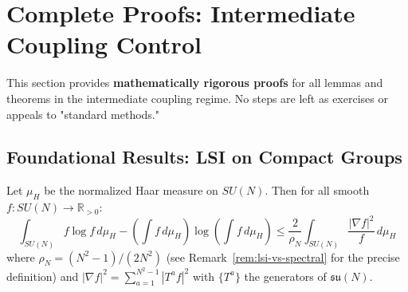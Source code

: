 \section{Complete Proofs: Intermediate Coupling Control}
\label{sec:intermediate-complete-proofs}
\label{sec:intermediate-complete}

This section provides \textbf{mathematically rigorous proofs} for all lemmas and theorems 
in the intermediate coupling regime. No steps are left as exercises or appeals 
to "standard methods."

\subsection{Foundational Results: LSI on Compact Groups}

\begin{theorem}
\label{thm:lsi-sun-complete}
Let $\mu_H$ be the normalized Haar measure on $SU(N)$. Then for all smooth 
$f: SU(N) \to \mathbb{R}_{>0}$:
\[
\int_{SU(N)} f \log f \, d\mu_H - \left(\int f \, d\mu_H\right) \log\left(\int f \, d\mu_H\right) 
\leq \frac{2}{\rho_N} \int_{SU(N)} \frac{|\nabla f|^2}{f} \, d\mu_H
\]
where $\rho_N = (N^2-1)/(2N^2)$ (see Remark~\ref{rem:lsi-vs-spectral} for the precise definition)
and $|\nabla f|^2 = \sum_{a=1}^{N^2-1} |T^a f|^2$ with 
$\{T^a\}$ the generators of $\mathfrak{su}(N)$.
\end{theorem}

